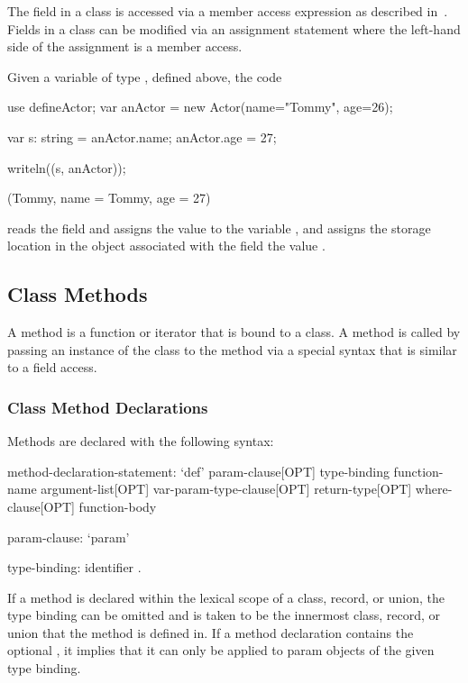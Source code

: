 The field in a class is accessed via a member access expression as
described in~.  Fields in a class can
be modified via an assignment statement where the left-hand side of
the assignment is a member access.
\begin{example}
Given a variable  of type , defined above,
the code
\begin{chapelpre}
use defineActor;
var anActor = new Actor(name="Tommy", age=26);
\end{chapelpre}
\begin{chapel}
var s: string = anActor.name;
anActor.age = 27;
\end{chapel}
\begin{chapelpost}
writeln((s, anActor));
\end{chapelpost}
\begin{chapeloutput}
(Tommy, {name = Tommy, age = 27})
\end{chapeloutput}
reads the field  and assigns the value to the variable
, and assigns the storage location in the object
 associated with the field  the value
.
\end{example}

\subsection{Class Methods}
\label{Class_Methods}

A method is a function or iterator that is bound to a class.  A method
is called by passing an instance of the class to the method via a
special syntax that is similar to a field access.

\subsubsection{Class Method Declarations}
\label{Class_Method_Declarations}

Methods are declared with the following syntax:
\begin{syntax}
method-declaration-statement:
  `def' param-clause[OPT] type-binding function-name argument-list[OPT] var-param-type-clause[OPT]
    return-type[OPT] where-clause[OPT] function-body

param-clause:
  `param'

type-binding:
  identifier .
\end{syntax}
If a method is declared within the lexical scope of a class, record,
or union, the type binding can be omitted and is taken to be the
innermost class, record, or union that the method is defined in.  If a
method declaration contains the optional , it
implies that it can only be applied to param objects of the given type
binding.

